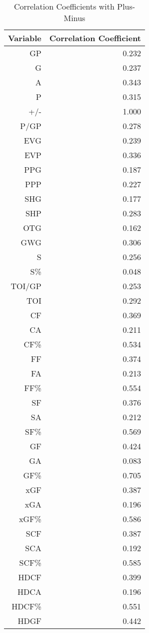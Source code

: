 \documentclass[12pt]{article}
\begin{document}
\begin{table}[tbp]
  \caption{Correlation Coefficients with Plus-Minus}
  \label{tab:rv}
\centering
\begin{tabular}{rr}
  \toprule
Variable & Correlation Coefficient \\ 
  \midrule
  GP & 0.232 \\ 
  G & 0.237 \\ 
  A & 0.343 \\ 
  P & 0.315 \\ 
  +/- & 1.000 \\ 
  P/GP & 0.278 \\ 
  EVG & 0.239 \\ 
  EVP & 0.336 \\ 
  PPG & 0.187 \\ 
  PPP & 0.227 \\ 
  SHG & 0.177 \\ 
  SHP & 0.283 \\ 
  OTG & 0.162 \\ 
  GWG & 0.306 \\ 
  S & 0.256 \\ 
  S\% & 0.048 \\ 
  TOI/GP & 0.253 \\ 
  TOI & 0.292 \\ 
  CF & 0.369 \\ 
  CA & 0.211 \\ 
  CF\% & 0.534 \\ 
  FF & 0.374 \\ 
  FA & 0.213 \\ 
  FF\% & 0.554 \\ 
  SF & 0.376 \\ 
  SA & 0.212 \\ 
  SF\% & 0.569 \\ 
  GF & 0.424 \\ 
  GA & 0.083 \\ 
  GF\% & 0.705 \\ 
  xGF & 0.387 \\ 
  xGA & 0.196 \\ 
  xGF\% & 0.586 \\ 
  SCF & 0.387 \\ 
  SCA & 0.192 \\ 
  SCF\% & 0.585 \\ 
  HDCF & 0.399 \\ 
  HDCA & 0.196 \\ 
  HDCF\% & 0.551 \\ 
  HDGF & 0.442 \\ 

\end{tabular}
\end{table}
\end{document}
